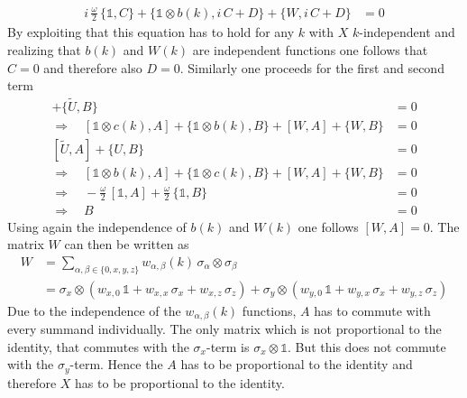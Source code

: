 \begin{align*}
    i\,\frac{\omega}{2}\,\{\mathbb{1},C\}+ \{\mathbb{1}\otimes b(k),i\,C+D\}+\{W,i\,C+D\}&=0
\end{align*}
By exploiting that this equation has to hold for any $k$ with $X$ $k$-independent and realizing that $b(k)$ and $W(k)$ are independent functions one follows that $C=0$ and therefore also $D=0$. Similarly one proceeds for the first and second term
\begin{align*}
    [U, A] + \{\tilde{U}, B\}&=0\\
    \Rightarrow\quad[\mathbb{1}\otimes c(k),A]+ \{\mathbb{1}\otimes b(k),B\}+[W,A]+\{W,B\}&=0\\
    [\tilde{U}, A] + \{U, B\}&=0\\
    \Rightarrow\quad[\mathbb{1}\otimes b(k),A]+ \{\mathbb{1}\otimes c(k),B\}+[W,A]+\{W,B\}&=0\\
    \Rightarrow\quad-\frac{\omega}{2}\,[\mathbb{1},A]+\frac{\omega}{2}\,\{\mathbb{1},B\}&=0\\
    \Rightarrow\quad B&=0
\end{align*}
Using again the independence of $b(k)$ and $W(k)$ one follows $[W,A]=0$. The matrix $W$ can then be written as
\begin{align*}
    W &= \sum_{\alpha,\beta\in\{0,x,y,z\}}w_{\alpha,\beta}(k)\,\sigma_\alpha\otimes\sigma_\beta\\
    &= \sigma_x\otimes\left( w_{x,0}\,\mathbb{1}+w_{x,x}\,\sigma_x+w_{x,z}\,\sigma_z \right)+\sigma_y\otimes\left( w_{y,0}\,\mathbb{1}+w_{y,x}\,\sigma_x+w_{y,z}\,\sigma_z \right)
\end{align*}
Due to the independence of the $w_{\alpha,\beta}(k)$ functions, $A$ has to commute with every summand individually. The only matrix which is not proportional to the identity, that commutes with the $\sigma_x$-term is $\sigma_x\otimes\mathbb{1}$. But this does not commute with the $\sigma_y$-term. Hence the $A$ has to be proportional to the identity and therefore $X$ has to be proportional to the identity.



